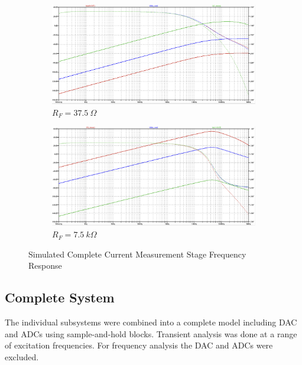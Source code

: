 \begin{figure}[H]
    \centering
    \begin{subfigure}[b]{0.48\textwidth}
        \centering
        \includegraphics[width=\textwidth]{CurMeas_37.5.png}
        \caption{$R_F = 37.5~\Omega$}
        \label{fig:i_meas_freq_37.5}
    \end{subfigure}\hfill
    \begin{subfigure}[b]{0.48\textwidth}
        \centering
        \includegraphics[width=\textwidth]{CurMeas_7500.png} 
        \caption{$R_F = 7.5~k\Omega$}
        \label{fig:i_meas_freq_7.5k}
    \end{subfigure}
    \caption{Simulated Complete Current Measurement Stage Frequency Response}
    \label{fig:i_meas_freq}
\end{figure}

\subsection{Complete System}
The individual subsystems were combined into a complete model including DAC and ADCs using sample-and-hold blocks. Transient analysis was done at a range of excitation frequencies. For frequency analysis the DAC and ADCs were excluded.


